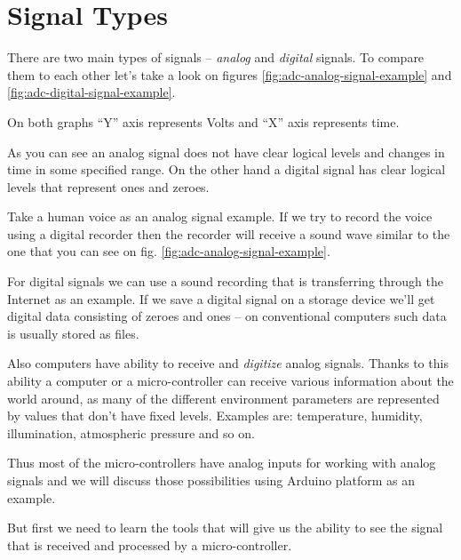 \documentclass[../sparc.tex]{subfiles}
\begin{document}
\section{Signal Types}

There are two main types of signals -- \emph{analog} and \emph{digital} signals.
To compare them to each other let's take a look on figures
\ref{fig:adc-analog-signal-example} and \ref{fig:adc-digital-signal-example}.



On both graphs ``Y'' axis represents Volts and ``X'' axis represents time.

As you can see an analog signal does not have clear logical levels and changes
in time in some specified range.  On the other hand a digital signal has clear
logical levels that represent ones and zeroes.

Take a human voice as an analog signal example.  If we try to record the voice
using a digital recorder then the recorder will receive a sound wave similar to
the one that you can see on fig. \ref{fig:adc-analog-signal-example}.

For digital signals we can use a sound recording that is transferring through
the Internet as an example.  If we save a digital signal on a storage device
we'll get digital data consisting of zeroes and ones -- on conventional computers
such data is usually stored as files.

Also computers have ability to receive and \emph{digitize} analog signals.
Thanks to this ability a computer or a micro-controller can receive various
information about the world around, as many of the different environment
parameters are represented by values that don’t have fixed levels.  Examples
are: temperature, humidity, illumination, atmospheric pressure and so on.

Thus most of the micro-controllers have analog inputs for working with analog
signals and we will discuss those possibilities using Arduino platform as an
example.

But first we need to learn the tools that will give us the ability to see the
signal that is received and processed by a micro-controller.
\end{document}
